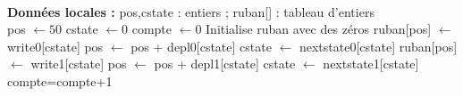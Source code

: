 \begin{solution}
\begin{algorithmic}[1]
\\
{\bf Donn\'ees locales : } pos,cstate : entiers ; ruban[] : tableau d'entiers
\\
\STATE pos $\leftarrow 50$
\STATE cstate $\leftarrow 0$
\STATE compte $\leftarrow 0$
\STATE Initialise ruban avec des zéros
\STATE ruban[pos] $\leftarrow$ write0[cstate]
\STATE pos $\leftarrow$ pos + depl0[cstate]
\STATE cstate $\leftarrow$ nextstate0[cstate]
\ELSE
\STATE ruban[pos] $\leftarrow$ write1[cstate]
\STATE pos $\leftarrow$ pos + depl1[cstate]
\STATE cstate $\leftarrow$ nextstate1[cstate]
\ENDIF
\STATE compte=compte+1
\ENDWHILE
\end{algorithmic}
\end{solution}

